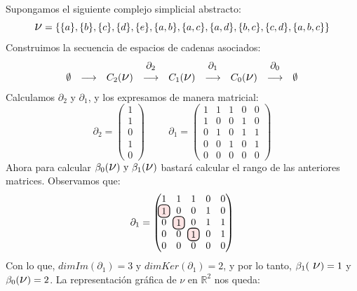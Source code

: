 \documentclass[12pt, a4paper, twoside]{book}
\newcommand\hlightr[1]{\tikz[overlay, remember picture,baseline=-
\the\dimexpr\fontdimen22\textfont2\relax]\node[rectangle,fill=red!50,rounded 
corners,fill opacity = 0.2,draw,thick,text opacity =1] {$#1$};}
\numberwithin{equation}{section}
\theoremstyle{definition}
\newenvironment{ejem}
  {\pushQED{\qed}\renewcommand{\qedsymbol}{$\blacktriangleleft$}\ejemplo}
  {\popQED\endejemplo}
\theoremstyle{remark}
\theoremstyle{plain}
\begin{document}
	\begin{ejem}
		Supongamos el siguiente complejo simplicial abstracto:
		\begin{equation*} 
			\text{{\Large $\nu$}}=\{\{a\},\{b\},\{c\},\{d\},\{e\},
			\{a,b\},\{a,c\},\{a,d\},\{b,c\},\{c,d\},\{a,b,c\}\}
		\end{equation*}
		Construimos la secuencia de espacios de cadenas asociados:
		\begin{equation*}
			 \left.
			\begin{array}{ccccccccc}
				 &  &  & \partial_{2} &  & 
				\partial_{1} &  & \partial_{0} & \\ 
				\emptyset & \longrightarrow & C_{2}(
				\text{{\Large $\nu$}}) & 
				\longrightarrow & C_{1}(\text{{\Large $\nu$}}) 
						& \longrightarrow 
				& C_{0}(\text{{\Large $\nu$}}) & 
				\longrightarrow & \emptyset 
			\end{array}
			\right. 
		\end{equation*}
		Calculamos $\partial_{2}$ y $\partial_{1}$, y los expresamos 
		de manera matricial:
		\begin{equation*}
			\partial_{2}=
			\begin{pmatrix}
			1 \\
			1 \\
			0 \\
			1 \\
			0
			\end{pmatrix}
			\hspace{1cm}
			\partial_{1}=
			\begin{pmatrix}
			1 & 1 & 1 & 0 & 0\\
			1 & 0 & 0 & 1 & 0\\
			0 & 1 & 0 & 1 & 1\\
			0 & 0 & 1 & 0 & 1\\
			0 & 0 & 0 & 0 & 0
			\end{pmatrix}
		\end{equation*}
		Ahora para calcular $\beta_{0}(\text{{\Large $\nu$}}) 
		\text{ y } \beta_{1}(\text{{\Large $\nu$}})$ bastará
		calcular el rango de las anteriores matrices. Observamos que:
		\begin{equation*}
			\partial_{1}=
			\begin{pmatrix}
			1 & 1 & 1 & 0 & 0\\
			\hlightr{1} & 0 & 0 & 1 & 0\\
			0 & \hlightr{1} & 0 & 1 & 1\\
			0 & 0 & \hlightr{1} & 0 & 1\\
			0 & 0 & 0 & 0 & 0
			\end{pmatrix}
		\end{equation*}
		Con lo que, $dimIm(\partial_{1})=3 \text{ y } 
		dimKer(\partial_{1})=2$, y por lo tanto, $\beta_{1}(\text{
		{\Large $\nu$}})=1$ y $\beta_{0}(\text{{\Large $\nu$}})=2$. La
		representación gráfica de {\Large $\nu$} en $\mathbb{R}^{2}$
		nos queda:
		\begin{figure}[H]
			\centering
\end{figure}
\end{ejem}
\end{document}

